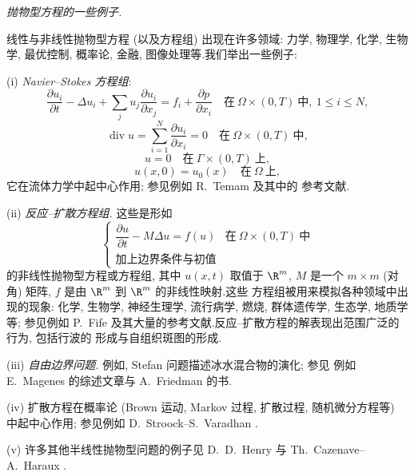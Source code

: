  \emph{抛物型方程的一些例子.}

线性与非线性抛物型方程 (以及方程组) 出现在许多领域: 力学, 物理学, 化学, 生物学, 最优控制, 概率论, 金融, 图像处理等.我们举出一些例子:

(i) \emph{Navier--Stokes 方程组}:
\begin{equation}
\frac{\partial u_i}{\partial t}-\Delta u_i+\sum_ju_j\frac{\partial u_i}
{\partial x_j}=f_i+\frac{\partial p}{\partial x_i}
\quad\text{在}\ \Omega\times(0,T)\ \text{中},\ 1\le i\le N,
\label{eq:10.47}
\end{equation}
\begin{equation}
\operatorname{div}u=\sum_{i=1}^N\frac{\partial u_i}{\partial x_i}=0
\quad\text{在}\ \Omega\times(0,T)\ \text{中},
\label{eq:10.48}
\end{equation}
\begin{equation}
u=0\quad\text{在}\ \Gamma\times(0,T)\ \text{上},
\label{eq:10.49}
\end{equation}
\begin{equation}
u(x,0)=u_0(x)\quad\text{在}\ \Omega\ \text{上},
\label{eq:10.50}
\end{equation}
它在流体力学中起中心作用; 参见例如 R.~Temam  及其中的
参考文献.

(ii) \emph{反应--扩散方程组.} 这些是形如
\begin{equation*}
\begin{cases}
\dfrac{\partial u}{\partial t}-M\Delta u=f(u)
& \text{在}\ \Omega\times(0,T)\ \text{中}\\
\text{加上边界条件与初值}
\end{cases}
\end{equation*}
的非线性抛物型方程或方程组, 其中 $u(x,t)$ 取值于 $\R^m$, $M$ 是一个
$m\times m$ (对角) 矩阵, $f$ 是由 $\R^m$ 到 $\R^m$ 的非线性映射.这些
方程组被用来模拟各种领域中出现的现象: 化学, 生物学, 神经生理学, 流行病学, 燃烧, 群体遗传学, 生态学, 地质学等; 参见例如 P.~Fife 
及其大量的参考文献.反应--扩散方程的解表现出范围广泛的行为, 包括行波的
形成与自组织斑图的形成.

(iii) \emph{自由边界问题.} 例如, Stefan 问题描述冰水混合物的演化; 参见
例如 E.~Magenes  的综述文章与 A.~Friedman
 的书.

(iv) 扩散方程在概率论 (Brown 运动, Markov 过程, 扩散过程, 随机微分方程等)
中起中心作用; 参见例如 D.~Stroock--S.~Varadhan .

(v) 许多其他半线性抛物型问题的例子见 D.~D.~Henry  与
Th.~Cazenave--A.~Haraux .

